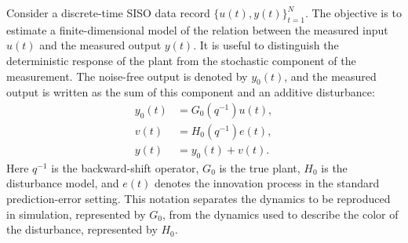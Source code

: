 \documentclass{ifacconf}
\begin{document}
Consider a discrete-time SISO data record
\(\{u(t),y(t)\}_{t=1}^{N}\).  The objective is to estimate a finite-dimensional
model of the relation between the measured input \(u(t)\) and the measured
output \(y(t)\).  It is useful to distinguish the deterministic response of the
plant from the stochastic component of the measurement.  The noise-free output
is denoted by \(y_0(t)\), and the measured output is written as the sum of this
component and an additive disturbance:
\begin{align}
  y_0(t) &= G_0(q^{-1})u(t), \\
  v(t)   &= H_0(q^{-1})e(t), \\
  y(t)   &= y_0(t) + v(t).
  \label{eq:true-system}
\end{align}
Here \(q^{-1}\) is the backward-shift operator, \(G_0\) is the true plant,
\(H_0\) is the disturbance model, and \(e(t)\) denotes the innovation process in
the standard prediction-error setting.  This notation separates the dynamics to
be reproduced in simulation, represented by \(G_0\), from the dynamics used to
describe the color of the disturbance, represented by \(H_0\).
\end{document}
